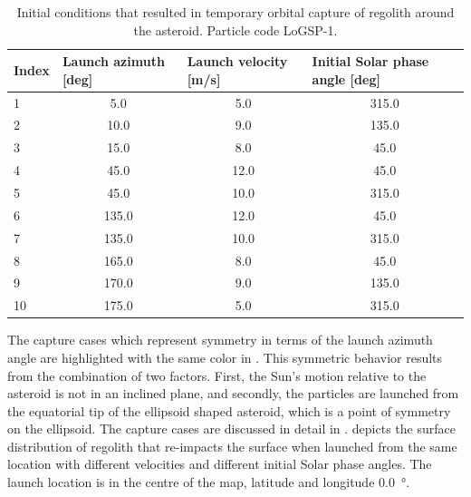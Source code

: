 \begin{table}[htb]
\centering
\captionsetup{justification=centering}
\caption{Initial conditions that resulted in temporary orbital capture of regolith around the asteroid. Particle code LoGSP-1.}
\label{tab:LoGSP_1_capture}
\begin{tabular}{|l|c|c|c|}
\hline
Index & \multicolumn{1}{l|}{Launch azimuth [deg]} & \multicolumn{1}{l|}{Launch velocity [m/s]} & \multicolumn{1}{l|}{Initial Solar phase angle [deg]} \\ \hline
\rowcolor[HTML]{FE996B}
1   & 5.0 & 5.0 & 315.0     \\ \hline
\rowcolor[HTML]{67FD9A}
2   & 10.0 & 9.0 & 135.0    \\ \hline
\rowcolor[HTML]{9698ED}
3   & 15.0 & 8.0 & 45.0     \\ \hline
\rowcolor[HTML]{FFCC67}
4   & 45.0 & 12.0 & 45.0    \\ \hline
\rowcolor[HTML]{96FFFB}
5   & 45.0 & 10.0 & 315.0   \\ \hline
\rowcolor[HTML]{FFCC67}
6   & 135.0 & 12.0 & 45.0   \\ \hline
\rowcolor[HTML]{96FFFB}
7   & 135.0 & 10.0 & 315.0  \\ \hline
\rowcolor[HTML]{9698ED}
8   & 165.0 & 8.0 & 45.0    \\ \hline
\rowcolor[HTML]{67FD9A}
9   & 170.0 & 9.0 & 135.0   \\ \hline
\rowcolor[HTML]{FE996B}
10  & 175.0 & 5.0 & 315.0   \\ \hline
\end{tabular}
\end{table}
\FloatBarrier
The capture cases which represent symmetry in terms of the launch azimuth angle are highlighted with the same color in . This symmetric behavior results from the combination of two factors. First, the Sun's motion relative to the asteroid is not in an inclined plane, and secondly, the particles are launched from the equatorial tip of the ellipsoid shaped asteroid, which is a point of symmetry on the ellipsoid. The capture cases are discussed in detail in .
%
\newline\newline
%
 depicts the surface distribution of regolith that re-impacts the surface when launched from the same location with different velocities and different initial Solar phase angles. The launch location is in the centre of the map, latitude and longitude \SI{0.0}{\degree}.
